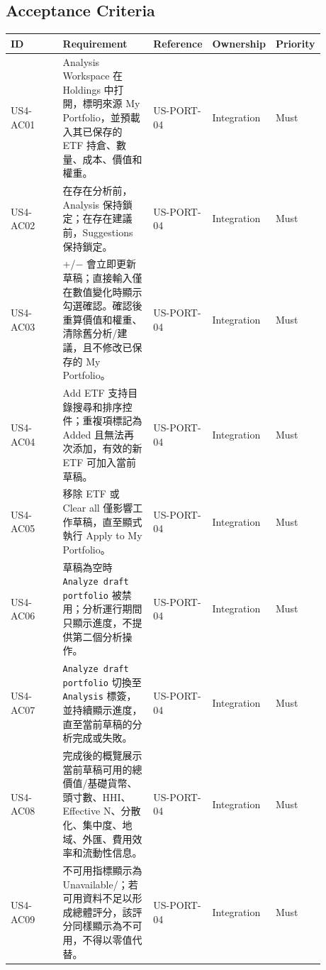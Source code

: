 \subsection{Acceptance Criteria}
\begingroup
\small
\begin{longtable}{L{0.18\linewidth}L{0.30\linewidth}L{0.18\linewidth}L{0.12\linewidth}L{0.10\linewidth}}
\toprule
\textbf{ID} & \textbf{Requirement} & \textbf{Reference} & \textbf{Ownership} & \textbf{Priority} \\
\midrule
US4-AC01 & Analysis Workspace 在 Holdings 中打開，標明來源 My Portfolio，並預載入其已保存的 ETF 持倉、數量、成本、價值和權重。 & US-PORT-04 & Integration & Must \\
US4-AC02 & 在存在分析前，Analysis 保持鎖定；在存在建議前，Suggestions 保持鎖定。 & US-PORT-04 & Integration & Must \\
US4-AC03 & +/\allowbreak{}\ensuremath{-} 會立即更新草稿；直接輸入僅在數值變化時顯示勾選確認。確認後重算價值和權重、清除舊分析/\allowbreak{}建議，且不修改已保存的 My Portfolio。 & US-PORT-04 & Integration & Must \\
US4-AC04 & Add ETF 支持目錄搜尋和排序控件；重複項標記為 Added 且無法再次添加，有效的新 ETF 可加入當前草稿。 & US-PORT-04 & Integration & Must \\
US4-AC05 & 移除 ETF 或 Clear all 僅影響工作草稿，直至顯式執行 Apply to My Portfolio。 & US-PORT-04 & Integration & Must \\
US4-AC06 & 草稿為空時 \texttt{Analyze draft portfolio} 被禁用；分析運行期間只顯示進度，不提供第二個分析操作。 & US-PORT-04 & Integration & Must \\
US4-AC07 & \texttt{Analyze draft portfolio} 切換至 \texttt{Analysis} 標簽，並持續顯示進度，直至當前草稿的分析完成或失敗。 & US-PORT-04 & Integration & Must \\
US4-AC08 & 完成後的概覽展示當前草稿可用的總價值/\allowbreak{}基礎貨幣、頭寸數、HHI、Effective N、分散化、集中度、地域、外匯、費用效率和流動性信息。 & US-PORT-04 & Integration & Must \\
US4-AC09 & 不可用指標顯示為 Unavailable/\allowbreak{}\textemdash{}；若可用資料不足以形成總體評分，該評分同樣顯示為不可用，不得以零值代替。 & US-PORT-04 & Integration & Must \\

\end{longtable}
